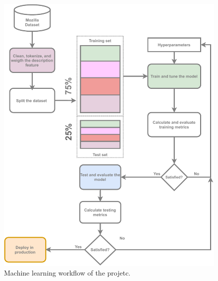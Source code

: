 \documentclass[a4paper]{article}
\begin{document}

\begin{figure}[h!]
    \centering
    \includegraphics[width=0.5\textheight]{0-project-proposal/figures/machine-learning-worflow.pdf}
    \caption{Machine learning workflow of the projetc.}
    \label{fig:machile-learning-workflow}
\end{figure}

\newpage
\bigskip
\printbibliography

\end{document}
